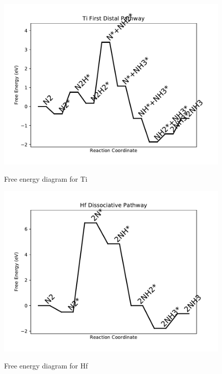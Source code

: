 \documentclass[journal=jacsat,manuscript=article]{achemso}
\begin{document}
\begin{figure}
\includegraphics[width=1\linewidth]{data/plots/Ti_distal_1.pdf}
\label{fig:Ti_distal_1}
\caption{Free energy diagram for Ti}
\end{figure}

\newpage
\begin{figure}
\includegraphics[width=1\linewidth]{data/plots/Hf_dissociative.pdf}
\label{fig:Hf_dissociative}
\caption{Free energy diagram for Hf}
\end{figure}
\end{document}
